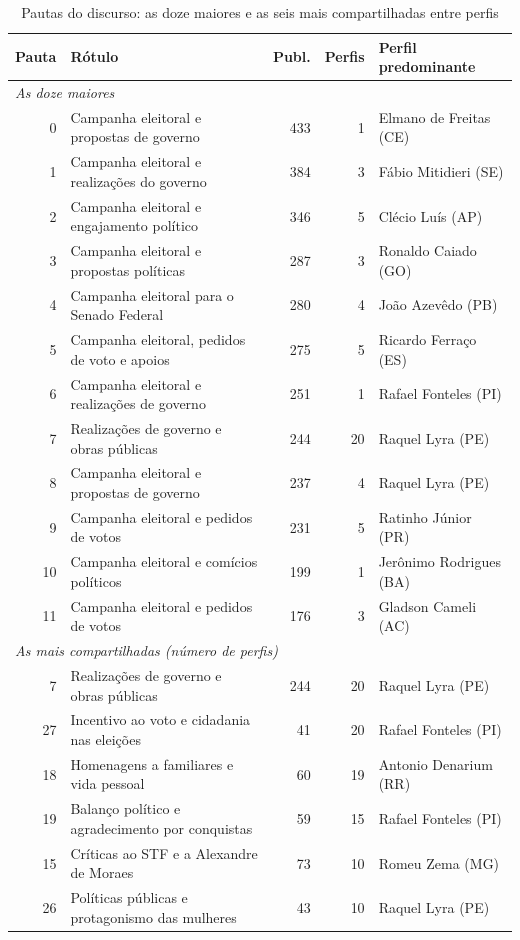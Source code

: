 \begin{table}[htb]
\centering
\caption{Pautas do discurso: as doze maiores e as seis mais compartilhadas entre perfis}
\label{tab:pautas}
\scriptsize\setlength{\tabcolsep}{3pt}
\begin{tabular}{rp{5.4cm}rrl}
\toprule
\textbf{Pauta} & \textbf{Rótulo} & \textbf{Publ.} & \textbf{Perfis} & \textbf{Perfil predominante} \\
\midrule
\multicolumn{5}{l}{\emph{As doze maiores}} \\
0 & Campanha eleitoral e propostas de governo & 433 & 1 & Elmano de Freitas (CE) \\
1 & Campanha eleitoral e realizações do governo & 384 & 3 & Fábio Mitidieri (SE) \\
2 & Campanha eleitoral e engajamento político & 346 & 5 & Clécio Luís (AP) \\
3 & Campanha eleitoral e propostas políticas & 287 & 3 & Ronaldo Caiado (GO) \\
4 & Campanha eleitoral para o Senado Federal & 280 & 4 & João Azevêdo (PB) \\
5 & Campanha eleitoral, pedidos de voto e apoios & 275 & 5 & Ricardo Ferraço (ES) \\
6 & Campanha eleitoral e realizações de governo & 251 & 1 & Rafael Fonteles (PI) \\
7 & Realizações de governo e obras públicas & 244 & 20 & Raquel Lyra (PE) \\
8 & Campanha eleitoral e propostas de governo & 237 & 4 & Raquel Lyra (PE) \\
9 & Campanha eleitoral e pedidos de votos & 231 & 5 & Ratinho Júnior (PR) \\
10 & Campanha eleitoral e comícios políticos & 199 & 1 & Jerônimo Rodrigues (BA) \\
11 & Campanha eleitoral e pedidos de votos & 176 & 3 & Gladson Cameli (AC) \\
\midrule
\multicolumn{5}{l}{\emph{As mais compartilhadas (número de perfis)}} \\
7 & Realizações de governo e obras públicas & 244 & 20 & Raquel Lyra (PE) \\
27 & Incentivo ao voto e cidadania nas eleições & 41 & 20 & Rafael Fonteles (PI) \\
18 & Homenagens a familiares e vida pessoal & 60 & 19 & Antonio Denarium (RR) \\
19 & Balanço político e agradecimento por conquistas & 59 & 15 & Rafael Fonteles (PI) \\
15 & Críticas ao STF e a Alexandre de Moraes & 73 & 10 & Romeu Zema (MG) \\
26 & Políticas públicas e protagonismo das mulheres & 43 & 10 & Raquel Lyra (PE) \\
\bottomrule
\end{tabular}
\end{table}

